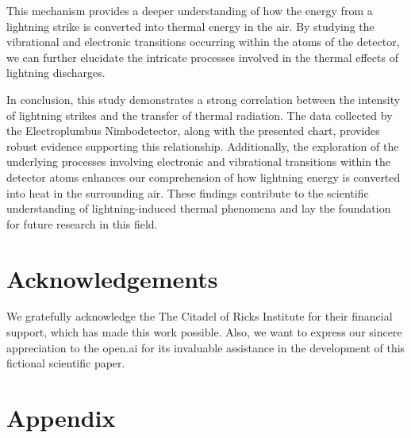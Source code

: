 \documentclass[english]{cenarticle} %
\begin{document}
%
This mechanism provides a deeper understanding of how the energy from a lightning strike is converted into thermal energy in the air. By studying the vibrational and electronic transitions occurring within the atoms of the detector, we can further elucidate the intricate processes involved in the thermal effects of lightning discharges.\par
%
In conclusion, this study demonstrates a strong correlation between the intensity of lightning strikes and the transfer of thermal radiation. The data collected by the Electroplumbus Nimbodetector, along with the presented chart, provides robust evidence supporting this relationship. Additionally, the exploration of the underlying processes involving electronic and vibrational transitions within the detector atoms enhances our comprehension of how lightning energy is converted into heat in the surrounding air. These findings contribute to the scientific understanding of lightning-induced thermal phenomena and lay the foundation for future research in this field.
%
\section*{Acknowledgements}
%
We gratefully acknowledge the The Citadel of Ricks Institute for their financial support, which has made this work possible. Also, we want to express our sincere appreciation to the open.ai for its invaluable assistance in the development of this fictional scientific paper.
%

%
%
\howtocite
%
\section*{Appendix}
%
\raggedleft{}\noindent
\begin{minipage}[b]{\linewidth-6.5mm}
  
\end{minipage}
%
\end{document}
